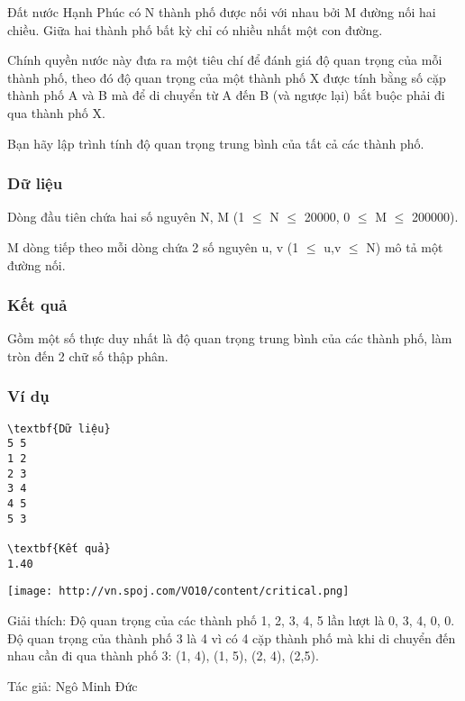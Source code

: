 

Đất nước Hạnh Phúc có N thành phố được nối với nhau bởi M đường nối hai chiều. Giữa hai thành phố bất kỳ chỉ có nhiều nhất một con đường.

Chính quyền nước này đưa ra một tiêu chí để đánh giá độ quan trọng của mỗi thành phố, theo đó độ quan trọng của một thành phố X được tính bằng số cặp thành phố A và B mà để di chuyển từ A đến B (và ngược lại) bắt buộc phải đi qua thành phố X.

Bạn hãy lập trình tính độ quan trọng trung bình của tất cả các thành phố.

\subsubsection{Dữ liệu}

Dòng đầu tiên chứa hai số nguyên N, M (1  $\le$  N  $\le$  20000, 0  $\le$  M  $\le$  200000).

M dòng tiếp theo mỗi dòng chứa 2 số nguyên u, v (1 $\le$ u,v  $\le$ N) mô tả một đường nối.

\subsubsection{Kết quả}

Gồm một số thực duy nhất là độ quan trọng trung bình của các thành phố, làm tròn đến 2 chữ số thập phân.

\subsubsection{Ví dụ}
\begin{verbatim}
\textbf{Dữ liệu}
5 5
1 2
2 3
3 4
4 5
5 3

\textbf{Kết quả}
1.40

\end{verbatim}


\texttt{[image: http://vn.spoj.com/VO10/content/critical.png]}

Giải thích: Độ quan trọng của các thành phố 1, 2, 3, 4, 5 lần lượt là 0, 3, 4, 0, 0. Độ quan trọng của thành phố 3 là 4 vì có 4 cặp thành phố mà khi di chuyển đến nhau cần đi qua thành phố 3: (1, 4), (1, 5), (2, 4), (2,5).

Tác giả: Ngô Minh Đức
